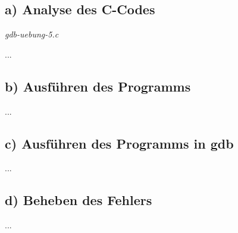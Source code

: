\documentclass[12pt]{article}
\begin{document}
\subsection{a) Analyse des C-Codes}
\textit{gdb-uebung-5.c}


...

\subsection{b) Ausführen des Programms}
...


\subsection{c) Ausführen des Programms in gdb}
...

\subsection{d) Beheben des Fehlers}
...
\end{document}
